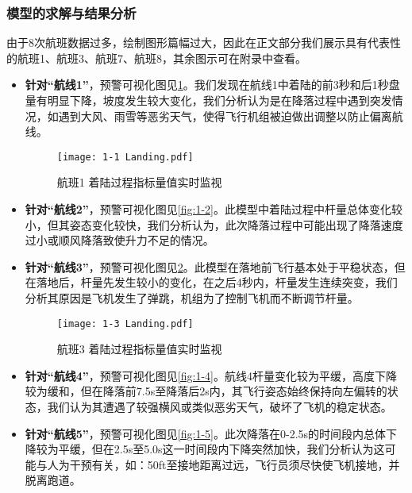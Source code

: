 \documentclass{MathorCupModeling}
\begin{document}
	\subsubsection{模型的求解与结果分析}\label{问题二结果}
	由于8次航班数据过多，绘制图形篇幅过大，因此在正文部分我们展示具有代表性的航班1、航班3、航班7、航班8，其余图示可在附录中查看。
	\begin{itemize}
		\item \textbf{针对“航线1”}，预警可视化图见\textcolor{blue}{\cref{fig:1-1}}。我们发现在航线1中着陆的前3秒和后1秒盘量有明显下降，坡度发生较大变化，我们分析认为是在降落过程中遇到突发情况，如遇到大风、雨雪等恶劣天气，使得飞行机组被迫做出调整以防止偏离航线。
		\begin{figure}[H]
			\centering
			\texttt{[image: 1-1 Landing.pdf]}
			\caption{航班1 着陆过程指标量值实时监视}
			\label{fig:1-1}
		\end{figure}
		\item \textbf{针对“航线2”}，预警可视化图见\textcolor{blue}{\cref{fig:1-2}}。此模型中着陆过程中杆量总体变化较小，但其姿态变化较快，我们分析认为，此次降落过程中可能出现了降落速度过小或顺风降落致使升力不足的情况。

		\item \textbf{针对“航线3”}，预警可视化图见\textcolor{blue}{\cref{fig:1-3}}。此模型在落地前飞行基本处于平稳状态，但在落地后，杆量先发生较小的变化，在之后4秒内，杆量发生连续突变，我们分析其原因是飞机发生了弹跳，机组为了控制飞机而不断调节杆量。
		\begin{figure}[H]
			\centering
			\texttt{[image: 1-3 Landing.pdf]}
			\caption{航班3 着陆过程指标量值实时监视}
			\label{fig:1-3}
		\end{figure}
		\item \textbf{针对“航线4”}，预警可视化图见\textcolor{blue}{\cref{fig:1-4}}。航线4杆量变化较为平缓，高度下降较为缓和，但在降落前7.5s至降落后2s内，其飞行姿态始终保持向左偏转的状态，我们认为其遭遇了较强横风或类似恶劣天气，破坏了飞机的稳定状态。

		\item \textbf{针对“航线5”}，预警可视化图见\textcolor{blue}{\cref{fig:1-5}}。此次降落在0-2.5s的时间段内总体下降较为平缓，但在2.5s至5.0s这一时间段内下降突然加快，我们分析认为这可能与人为干预有关，如：50ft至接地距离过远，飞行员须尽快使飞机接地，并脱离跑道。


\end{itemize}
\end{document}

